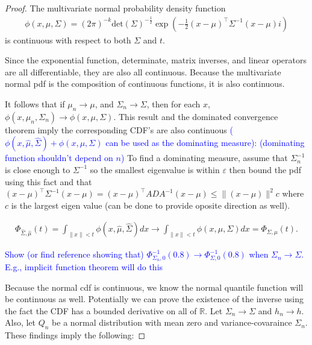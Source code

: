 \documentclass{article}
\newcommand{\vmat}{\Sigma}
\newcommand{\pf}{\Phi}
\begin{document}
\begin{proof}
	The multivariate normal probability density function
\begin{align*}
	\phi(x, \mu, \Sigma) = \left(2\pi\right)^{-k} \text{det}\left({\Sigma}\right)^{- \frac{1}{2}} \exp\left(-\frac{1}{2} (x - \mu)^\top \Sigma^{-1}(x - \mu)i\right) 
\end{align*}	
is continuous with respect to both $\Sigma$ and $t$.

Since the exponential function, determinate, matrix inverses, and linear operators are all differentiable, they are also all continuous.  Because the multivariate normal pdf is the composition of continuous functions, it is also continuous.

It follows that if $\mu_n \rightarrow \mu$, and $\Sigma_n \rightarrow \Sigma$, then for each $x$, $\phi(x, \mu_n, \Sigma_n) \rightarrow \phi(x, \mu, \Sigma)$.
This result and the dominated convergence theorem imply the corresponding CDF's are also continuous \textcolor{blue}{($\phi(x, \hat{\mu}, \hat{\Sigma}) + \phi(x, \mu, \Sigma)$ can be used as the dominating measure): (dominating function shouldn't depend on $n$)}  To find a dominating measure, assume that $\vmat_n^{-1}$ is close enough to $\vmat^{-1}$ so the smallest eigenvalue is within $\varepsilon$ then bound the pdf using this fact and that $(x - \mu)^\top \Sigma^{-1}(x - \mu) = (x - \mu)^\top ADA^{-1}(x - \mu) \leq \|(x - \mu)\|^2 c$ where $c$ is the largest eigen value (can be done to provide oposite direction as well).

\begin{align*}
	\pf_{\hat{\Sigma}, \hat{\mu}}\left(t \right) = \int_{\|x\| < t} \phi(x, \hat{\mu}, \hat{\Sigma})dx \rightarrow \int_{\|x\| < t} \phi(x, \mu, \Sigma)dx = \Phi_{\Sigma, \mu}(t).
\end{align*}

\textcolor{blue}{Show (or find reference showing that) $\Phi_{\Sigma_n,0}^{-1}(0.8)\rightarrow \Phi_{\Sigma,0}^{-1}(0.8)$ when $\Sigma_n\rightarrow \Sigma$. E.g., implicit function theorem will do this}

Because the normal cdf is continuous, we know the normal quantile function will be continuous as well. Potentially we can prove the existence of the inverse using the fact the CDF has a bounded derivative on all of $\mathbb{R}$.  Let $\Sigma_n \rightarrow \Sigma$ and $h_n \rightarrow h$.  Also, let $Q_n$ be a normal distribution with mean zero and variance-covaraince $\Sigma_n$.  These findings imply the following: 


\end{proof}
\end{document}
